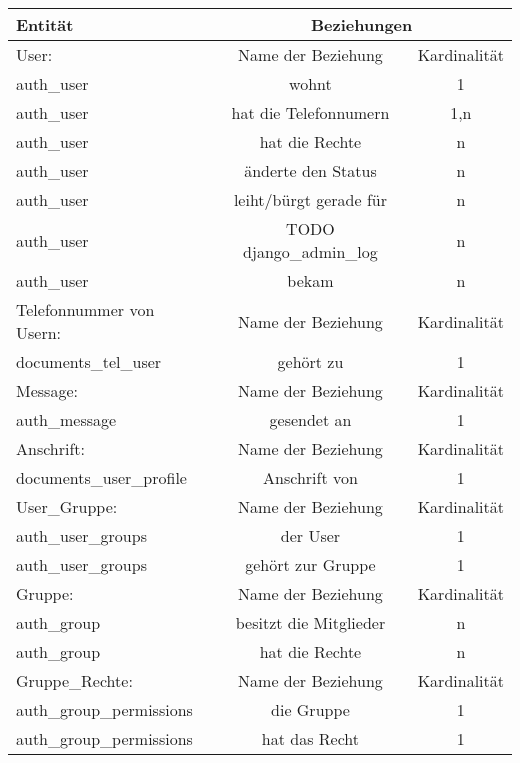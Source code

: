 \begin{tabular}[ht]{|l||c|c|}
  \hline
  Entit\"at & \multicolumn{2}{c|}{Beziehungen} \\
  \hline\hline\hline
    
  User: & Name der Beziehung & Kardinalität\\
  \hline\hline
  auth\_user & wohnt & 1\\
  \hline
  auth\_user & hat die Telefonnumern & 1,n\\
  \hline
  auth\_user & hat die Rechte & n\\
  \hline
  auth\_user & änderte den Status & n\\  
  \hline
  auth\_user & leiht/bürgt gerade für & n\\
  \hline
  auth\_user & TODO django\_admin\_log & n\\
  \hline
  auth\_user & bekam & n\\
  \hline\hline\hline
  
  Telefonnummer von Usern:  & Name der Beziehung &  Kardinalit\"at\\
  \hline\hline
  documents\_tel\_user & gehört zu & 1 \\
  \hline\hline\hline 
  
  Message: & Name der Beziehung &  Kardinalit\"at\\
  \hline\hline
  auth\_message & gesendet an & 1 \\
  \hline\hline\hline 
  
  Anschrift:  & Name der Beziehung &  Kardinalit\"at\\
  \hline\hline
  documents\_user\_profile & Anschrift von & 1 \\
  \hline\hline\hline
  
  User\_Gruppe:  & Name der Beziehung &  Kardinalit\"at\\
  \hline\hline
  auth\_user\_groups & der User & 1 \\
  \hline
  auth\_user\_groups & gehört zur Gruppe & 1 \\
  \hline\hline\hline
  
  Gruppe: & Name der Beziehung &  Kardinalit\"at\\
  \hline\hline
  auth\_group & besitzt die Mitglieder & n \\
  \hline
  auth\_group & hat die Rechte & n \\
  \hline\hline\hline 

  Gruppe\_Rechte: & Name der Beziehung &  Kardinalit\"at\\
  \hline\hline
  auth\_group\_permissions & die Gruppe & 1 \\
  \hline
  auth\_group\_permissions & hat das Recht & 1 \\
  \hline\hline\hline 
  

\end{tabular}
